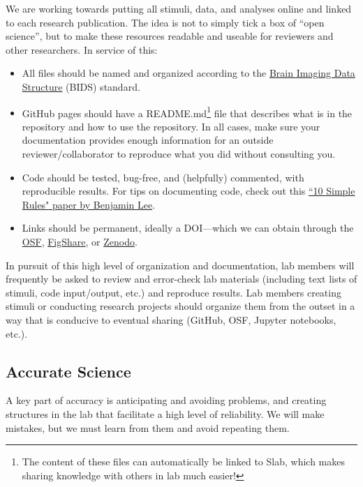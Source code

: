 \documentclass[letterpaper,11pt,oneside]{memoir}
\begin{document}
We are working towards putting all stimuli, data, and analyses online and linked to each research publication. The idea is not to simply tick a box of ``open science'', but to make these resources readable and useable for reviewers and other researchers. In service of this:

\begin{itemize}
\item All files should be named and organized according to the \href{https://bids.neuroimaging.io/}{Brain Imaging Data Structure} (BIDS) standard.
\item GitHub pages should have a README.md\footnote{The content of these files can automatically be linked to Slab, which makes sharing knowledge with others in lab much easier!} file that describes what is in the repository and how to use the repository. In all cases, make sure your documentation provides enough information for an outside reviewer/collaborator to reproduce what you did without consulting you.
\item Code should be tested, bug-free, and (helpfully) commented, with reproducible results. For tips on documenting code, check out this \href{https://journals.plos.org/ploscompbiol/article?id=10.1371/journal.pcbi.1006561}{``10 Simple Rules" paper by Benjamin Lee}.
\item Links should be permanent, ideally a DOI---which we can obtain through the \href{http://help.osf.io/m/sharing/l/524208-create-dois-and-arks}{OSF}, \href{https://figshare.com/}{FigShare}, or \href{https://zenodo.org/}{Zenodo}.
\end{itemize}

In pursuit of this high level of organization and documentation, lab members will frequently be asked to review and error-check lab materials (including text lists of stimuli, code input/output, etc.) and reproduce results. Lab members creating stimuli or conducting research projects should organize them from the outset in a way that is conducive to eventual sharing (GitHub, OSF, Jupyter notebooks, etc.).


\subsection{Accurate Science}

A key part of accuracy is anticipating and avoiding problems, and creating structures in the lab that facilitate a high level of reliability. We will make mistakes, but we must learn from them and avoid repeating them.
\end{document}
